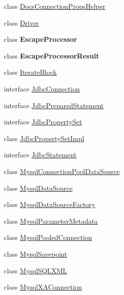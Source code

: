 \begin{DoxyCompactItemize}
\item 
class \mbox{\hyperlink{classcom_1_1mysql_1_1cj_1_1jdbc_1_1_docs_connection_props_helper}{Docs\+Connection\+Props\+Helper}}
\item 
class \mbox{\hyperlink{classcom_1_1mysql_1_1cj_1_1jdbc_1_1_driver}{Driver}}
\item 
class {\bfseries Escape\+Processor}
\item 
class {\bfseries Escape\+Processor\+Result}
\item 
class \mbox{\hyperlink{classcom_1_1mysql_1_1cj_1_1jdbc_1_1_iterate_block}{Iterate\+Block}}
\item 
interface \mbox{\hyperlink{interfacecom_1_1mysql_1_1cj_1_1jdbc_1_1_jdbc_connection}{Jdbc\+Connection}}
\item 
interface \mbox{\hyperlink{interfacecom_1_1mysql_1_1cj_1_1jdbc_1_1_jdbc_prepared_statement}{Jdbc\+Prepared\+Statement}}
\item 
interface \mbox{\hyperlink{interfacecom_1_1mysql_1_1cj_1_1jdbc_1_1_jdbc_property_set}{Jdbc\+Property\+Set}}
\item 
class \mbox{\hyperlink{classcom_1_1mysql_1_1cj_1_1jdbc_1_1_jdbc_property_set_impl}{Jdbc\+Property\+Set\+Impl}}
\item 
interface \mbox{\hyperlink{interfacecom_1_1mysql_1_1cj_1_1jdbc_1_1_jdbc_statement}{Jdbc\+Statement}}
\item 
class \mbox{\hyperlink{classcom_1_1mysql_1_1cj_1_1jdbc_1_1_mysql_connection_pool_data_source}{Mysql\+Connection\+Pool\+Data\+Source}}
\item 
class \mbox{\hyperlink{classcom_1_1mysql_1_1cj_1_1jdbc_1_1_mysql_data_source}{Mysql\+Data\+Source}}
\item 
class \mbox{\hyperlink{classcom_1_1mysql_1_1cj_1_1jdbc_1_1_mysql_data_source_factory}{Mysql\+Data\+Source\+Factory}}
\item 
class \mbox{\hyperlink{classcom_1_1mysql_1_1cj_1_1jdbc_1_1_mysql_parameter_metadata}{Mysql\+Parameter\+Metadata}}
\item 
class \mbox{\hyperlink{classcom_1_1mysql_1_1cj_1_1jdbc_1_1_mysql_pooled_connection}{Mysql\+Pooled\+Connection}}
\item 
class \mbox{\hyperlink{classcom_1_1mysql_1_1cj_1_1jdbc_1_1_mysql_savepoint}{Mysql\+Savepoint}}
\item 
class \mbox{\hyperlink{classcom_1_1mysql_1_1cj_1_1jdbc_1_1_mysql_s_q_l_x_m_l}{Mysql\+S\+Q\+L\+X\+ML}}
\item 
class \mbox{\hyperlink{classcom_1_1mysql_1_1cj_1_1jdbc_1_1_mysql_x_a_connection}{Mysql\+X\+A\+Connection}}

\end{DoxyCompactItemize}
